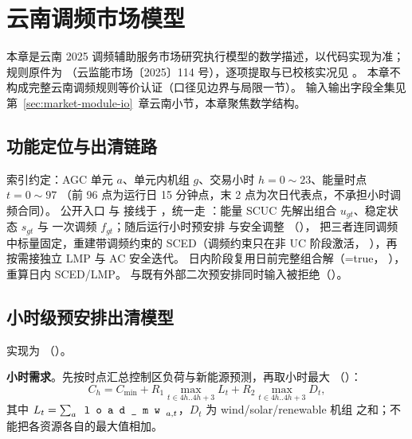 \section{云南调频市场模型}\label{sec:yunnan-regulation}

\begin{theorynote}
本章是云南 2025 调频辅助服务市场研究执行模型的数学描述，以代码实现为准；
规则原件为 
（云监能市场〔2025〕114 号），逐项提取与已校核实况见
。
本章不构成完整云南调频规则等价认证（口径见边界与局限一节）。
输入输出字段全集见第~\ref{sec:market-module-io}~章云南小节，本章聚焦数学结构。
\end{theorynote}

\subsection{功能定位与出清链路}
索引约定：AGC 单元 $a$、单元内机组 $g$、交易小时 $h=0\sim23$、能量时点 $t=0\sim97$
（前 96 点为运行日 15 分钟点，末 2 点为次日代表点，不承担小时调频合同）。
公开入口  与 
接线于 ，统一走
：能量 SCUC 先解出组合 $u_{gt}$、稳定状态 $s_{gt}$ 与
一次调频 $f_{gt}$；随后运行小时预安排  与安全调整
（），
把三者连同调频中标量固定，重建带调频约束的 SCED（调频约束只在非 UC 阶段激活，
），再按需接独立 LMP 与 AC 安全迭代。
日内阶段复用日前完整组合解（=true，
），重算日内 SCED/LMP。
与既有外部二次预安排同时输入被拒绝（）。

\subsection{小时级预安排出清模型}
实现为 （）。

\textbf{小时需求}。先按时点汇总控制区负荷与新能源预测，再取小时最大
（）：
\begin{equation}
 C_h=C_{\min}+R_1\max_{t\in 4h..4h+3}L_t+R_2\max_{t\in 4h..4h+3}D_t,
\end{equation}
其中 $L_t=\sum_a \fld{load\_mw}_{a,t}$，$D_t$ 为 wind/solar/renewable 机组
 之和；不能把各资源各自的最大值相加。

